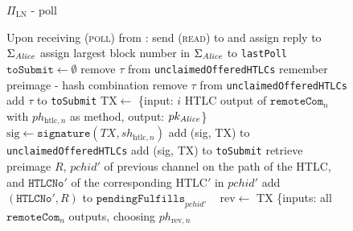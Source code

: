   \begin{figure}[H]
    \begin{protocolbox}{$\Pi_{\mathrm{LN}}$ - poll}
      \begin{algorithmic}[1]
        \State Upon receiving (\textsc{poll}) from \environment:
        \Indent
          \State send (\textsc{read}) to \ledger{} and assign reply to
          $\Sigma_{\mathit{Alice}}$
          \State assign largest block number in $\Sigma_{\mathit{Alice}}$ to
          \texttt{lastPoll}
        \State $\mathtt{toSubmit} \gets \emptyset$
             
              \State remove $\tau$ from \texttt{unclaimedOfferedHTLCs}
              \State remember preimage - hash combination
              \State remove $\tau$ from \texttt{unclaimedOfferedHTLCs}
              \State add $\tau$ to \texttt{toSubmit}
            \EndIf
          \EndFor
             
                \State $\mathrm{TX} \gets$ \{input: $i$ HTLC output of
                $\mathtt{remoteCom}_n$ with $ph_{\mathrm{htlc}, n}$ as method,
                output: $pk_{\mathit{Alice}}$\}
                \State $\mathrm{sig} \gets \mathtt{signature}\left(TX,
                sh_{\mathrm{htlc}, n}\right)$
                  \State add (sig, TX) to \texttt{unclaimedOfferedHTLCs}
                  \State add (sig, TX) to \texttt{toSubmit}
                \EndIf
              \EndFor
                  \State retrieve preimage $R$, $\mathit{pchid}'$ of previous
                  channel on the path of the HTLC, and $\mathtt{HTLCNo}'$ of the
                  corresponding $\mathrm{HTLC}'$ in $\mathit{pchid}'$
                  \State add $\left(\mathtt{HTLCNo}', R\right)$ to
                  $\mathtt{pendingFulfills}_{\mathit{pchid}'}$
                \EndIf
              \EndFor
            \Else \ 
              \State $\mathrm{rev} \gets$ TX \{inputs: all
              $\mathtt{remoteCom}_n$ outputs, choosing $ph_{\mathrm{rev}, n}$

\end{algorithmic}
\end{protocolbox}
\end{figure}
